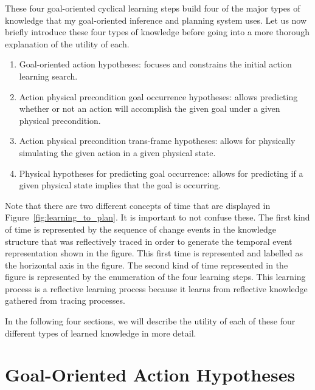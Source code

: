 These four goal-oriented cyclical learning steps build four of the
major types of knowledge that my goal-oriented inference and planning
system uses.  Let us now briefly introduce these four types of
knowledge before going into a more thorough explanation of the utility
of each.

\begin{enumerate}

\item{Goal-oriented action hypotheses: focuses and constrains the
  initial action learning search.}

\item{Action physical precondition goal occurrence hypotheses: allows
  predicting whether or not an action will accomplish the given goal
  under a given physical precondition.}

\item{Action physical precondition trans-frame hypotheses: allows for
  physically simulating the given action in a given physical state.}

\item{Physical hypotheses for predicting goal occurrence: allows for
  predicting if a given physical state implies that the goal is
  occurring.}

\end{enumerate}

Note that there are two different concepts of time that are displayed
in Figure~\ref{fig:learning_to_plan}.  It is important to not confuse
these.  The first kind of time is represented by the sequence of
change events in the knowledge structure that was reflectively traced
in order to generate the temporal event representation shown in the
figure.  This first time is represented and labelled as the horizontal
axis in the figure.  The second kind of time represented in the figure
is represented by the enumeration of the four learning steps.  This
learning process is a reflective learning process because it learns
from reflective knowledge gathered from tracing processes.

In the following four sections, we will describe the utility of each
of these four different types of learned knowledge in more detail.

\section{Goal-Oriented Action Hypotheses}
\label{sec:goal_oriented_action_hypotheses}

